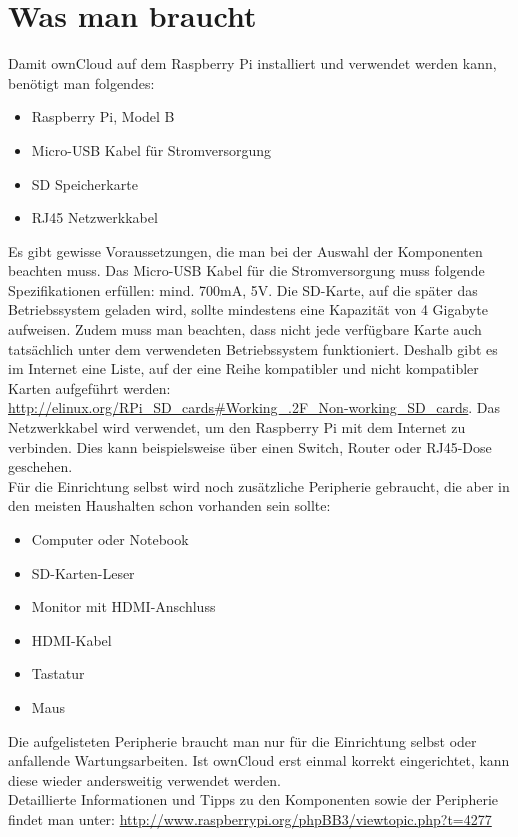 \section{Was man braucht}
Damit ownCloud auf dem Raspberry Pi installiert und verwendet werden kann, benötigt man folgendes:

\begin{itemize}
  \item Raspberry Pi, Model B
  \item Micro-USB Kabel für Stromversorgung
  \item SD Speicherkarte
  \item RJ45 Netzwerkkabel
\end{itemize}

Es gibt gewisse Voraussetzungen, die man bei der Auswahl der Komponenten beachten muss. Das Micro-USB Kabel für die Stromversorgung muss folgende Spezifikationen erfüllen: mind. 700mA, 5V. Die SD-Karte, auf die später das Betriebssystem geladen wird, sollte mindestens eine Kapazität von 4 Gigabyte aufweisen. Zudem muss man beachten, dass nicht jede verfügbare Karte auch tatsächlich unter dem verwendeten Betriebssystem funktioniert. Deshalb gibt es im Internet eine Liste, auf der eine Reihe kompatibler und nicht kompatibler Karten aufgeführt werden: \url{http://elinux.org/RPi\_SD\_cards\#Working\_.2F\_Non-working\_SD\_cards}. 
Das Netzwerkkabel wird verwendet, um den Raspberry Pi mit dem Internet zu verbinden. Dies kann beispielsweise über einen Switch, Router oder RJ45-Dose geschehen.
\\
Für die Einrichtung selbst wird noch zusätzliche Peripherie gebraucht, die aber in den meisten Haushalten schon vorhanden sein sollte: 

\begin{itemize}
  \item Computer oder Notebook
  \item SD-Karten-Leser
  \item Monitor mit HDMI-Anschluss
  \item HDMI-Kabel
  \item Tastatur
  \item Maus
\end{itemize}

Die aufgelisteten Peripherie braucht man nur für die Einrichtung selbst oder anfallende Wartungsarbeiten.
Ist ownCloud erst einmal korrekt eingerichtet, kann diese wieder andersweitig verwendet werden.
\\
Detaillierte Informationen und Tipps zu den Komponenten sowie der Peripherie findet man unter: \url{http://www.raspberrypi.org/phpBB3/viewtopic.php?t=4277}

